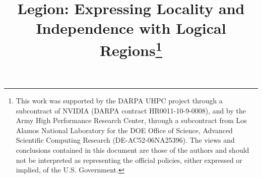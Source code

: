 \documentclass[conference]{IEEEtran}
\begin{document}
\pdfpagewidth=8.5in
\pdfpageheight=11in



\title{Legion: Expressing Locality and Independence with Logical
  Regions\thanks{This work was supported by the DARPA UHPC project
    through a subcontract of NVIDIA (DARPA contract HR0011-10-9-0008),
    and by the Army High Performance Research Center, through a subcontract
    from Los Alamos National Laboratory for the DOE Office of Science,
    Advanced Scientific Computing Research (DE-AC52-06NA25396).  The views and
    conclusions contained in this document are those of the authors
    and should not be interpreted as representing the official
    policies, either expressed or implied, of the U.S. Government.}}

\author{
\and
{}
\and
{}
\and
{}
}


\maketitle
\end{document}
